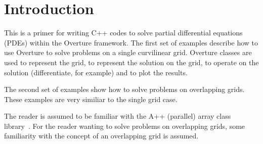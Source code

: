 \documentclass{article}
\begin{document}
\vfill\eject

\newcommand{\MGF}{Mapped\-Grid\-Function}
\newcommand{\GCF}{Grid\-Collection\-Function}
\newcommand{\CGF}{Composite\-Grid\-Function}

\newcommand{\MGO}{Mapped\-Grid\-Operators}
\newcommand{\GCO}{Grid\-Collection\-Operators}
\newcommand{\CGO}{Composite\-Grid\-Operators}

\newcommand{\primer}{\homeHenshaw/Overture/primer}
\newcommand{\gf}{\homeHenshaw/Overture/gf}

\newcommand{\figures}{\homeHenshaw/OvertureFigures}

\newcommand{\ogshow}{\homeHenshaw/Overture/ogshow}
\newcommand{\oges}{\homeHenshaw/Overture/oges}
\newcommand{\cgsh}{\homeHenshaw/Overture/cgsh}


\section{Introduction}

This is a primer for writing C++ codes to solve partial
differential equations (PDEs) within the Overture framework. 
The first set of examples describe how to use Overture to solve
problems on a single curvilinear grid. Overture classes are used
to represent the grid, to represent the solution on the grid, to operate
on the solution (differentiate, for example) and to plot the results.

The second set of examples show how to solve problems on overlapping grids.
These examples are very similiar to the single grid case.

The reader is assumed to be familiar with the A++ (parallel) array
class library~\cite{A++}. For the reader wanting to solve problems
on overlapping grids, some familiarity with the concept of an overlapping grid
is assumed.
\end{document}
